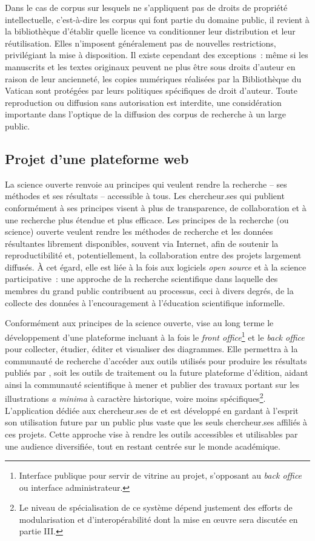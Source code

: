 Dans le cas de corpus sur lesquels ne s'appliquent pas de droits de
propriété intellectuelle, c'est-à-dire les corpus qui font partie du
domaine public, il revient à la bibliothèque d'établir quelle licence
va conditionner leur distribution et leur réutilisation. Elles
n'imposent généralement pas de nouvelles restrictions, privilégiant la
mise à disposition. Il existe cependant des exceptions~: même si les
manuscrits et les textes originaux peuvent ne plus être sous droits
d'auteur en raison de leur ancienneté, les copies numériques réalisées
par la Bibliothèque du Vatican sont protégées par leurs politiques
spécifiques de droit d'auteur. Toute reproduction ou diffusion sans
autorisation est interdite, une considération importante dans l'optique de la diffusion des corpus de recherche à un large public.

\hypertarget{projet-dune-plateforme-web}{%
\subsection{Projet d'une plateforme
web}\label{projet-dune-plateforme-web}}

La science ouverte renvoie au principes qui veulent rendre la recherche
-- ses méthodes et ses résultats -- accessible à tous. Les chercheur.ses
qui publient conformément à ses principes visent à plus de transparence,
de collaboration et à une recherche plus étendue et plus efficace. Les
principes de la recherche (ou science) ouverte veulent rendre les
méthodes de recherche et les données résultantes librement disponibles,
souvent via Internet, afin de soutenir la reproductibilité et,
potentiellement, la collaboration entre des projets largement diffusés.
À cet égard, elle est liée à la fois aux logiciels \emph{open source} et à la
science participative~: une approche de la recherche scientifique dans
laquelle des membres du grand public contribuent au processus, ceci à
divers degrés, de la collecte des données à l'encouragement à
l'éducation scientifique informelle.

Conformément aux principes de la science ouverte, \eida vise au long
terme le développement d'une plateforme incluant à la fois le
\textit{front office}\footnote{Interface publique pour servir de vitrine au projet, s'opposant au \emph{back office} ou interface administrateur.} et le \textit{back office} pour collecter, étudier,
éditer et visualiser des diagrammes. Elle
permettra à la communauté de recherche d'accéder aux outils utilisés
pour produire les résultats publiés par \eida, soit les outils de
traitement ou la future plateforme d'édition, aidant ainsi la communauté
scientifique à mener et publier des travaux portant sur les
illustrations \emph{a minima} à caractère historique, voire moins
spécifiques\footnote{Le niveau de spécialisation de ce système dépend
  justement des efforts de modularisation et d'interopérabilité dont la
  mise en œuvre sera discutée en partie III.}. L'application dédiée aux chercheur.ses de \eida et \vhs est développé en gardant à l'esprit son utilisation future par
un public plus vaste que les seuls chercheur.ses affiliés à ces projets.
Cette approche vise à rendre les outils accessibles et utilisables par
une audience diversifiée, tout en restant centrée sur le monde
académique.

